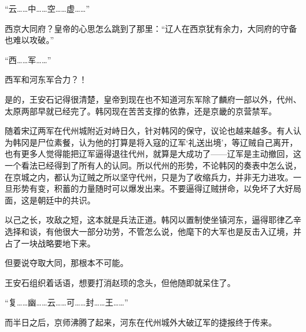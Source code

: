 “云……中……空……虚……”

西京大同府？皇帝的心思怎么跳到了那里：“辽人在西京犹有余力，大同府的守备也难以攻破。”

“西……军……”

西军和河东军合力？！

是的，王安石记得很清楚，皇帝到现在也不知道河东军除了麟府一部以外，代州、太原两部早就已经完了。韩冈现在苦苦支撑的依靠，还是京畿的京营禁军。

随着宋辽两军在代州城附近对峙日久，针对韩冈的保守，议论也越来越多。有人认为韩冈是尸位素餐，认为他的打算是将入寇的辽军‘礼送出境’，等辽贼自己离开，也有更多人觉得能把辽军逼得退往代州，就算是大成功了——辽军是主动撤回，这一个看法已经得到了所有人的认同。所以代州的形势，不论韩冈的奏表中怎么说，在京城之内，都认为辽贼之所以坚守代州，只是为了收缩兵力，并非无力进攻。一旦形势有变，积蓄的力量随时可以爆发出来。不要逼得辽贼拼命，以免坏了大好局面，这是朝廷中的共识。

以己之长，攻敌之短，这本就是兵法正道。韩冈以置制使坐镇河东，逼得耶律乙辛选择和谈，有他很大一部分功劳，不管怎么说，他麾下的大军也是反击入辽境，并占了一块战略要地下来。

但要说夺取大同，那根本不可能。

王安石组织着话语，想要打消赵顼的念头，但他随即就呆住了。

“复……幽……云……可……封……王……”

而半日之后，京师沸腾了起来，河东在代州城外大破辽军的捷报终于传来。

